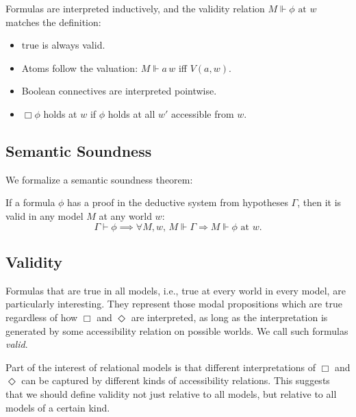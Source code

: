 Formulas are interpreted inductively, and the validity relation $M \Vdash \phi \text{ at } w$ matches the definition:

\begin{definition}
  \label{def:eample}
  \leanok
\begin{itemize}
  \item $\text{true}$ is always valid.
  \item Atoms follow the valuation: $M \Vdash a\, w$ iff $V(a, w)$.
  \item Boolean connectives are interpreted pointwise.
  \item $\Box \phi$ holds at $w$ if $\phi$ holds at all $w'$ accessible from $w$.
\end{itemize}
\end{definition}

\subsection{Semantic Soundness}

We formalize a semantic soundness theorem:

\begin{theorem}
    \label{thm:semantic-soundness}
  \leanok
If a formula $\phi$ has a proof in the deductive system from hypotheses $\Gamma$, then it is valid in any model $M$ at any world $w$:
\[
\Gamma \vdash \phi \implies \forall M, w,\, M \Vdash \Gamma \Rightarrow M \Vdash \phi \text{ at } w.
\]
\end{theorem}

\subsection{Validity}

Formulas that are true in all models, i.e., true at every world in 
every model, are particularly interesting. They represent those modal 
propositions which are true regardless of how $\Box$ and $\Diamond$ are 
interpreted, as long as the interpretation is generated by some accessibility 
relation on possible worlds. We call such formulas \emph{valid}.

Part of the interest of relational models is that different interpretations 
of $\Box$ and $\Diamond$ can be captured by different kinds of accessibility 
relations. This suggests that we should define validity not just relative to 
all models, but relative to all models of a certain kind.

